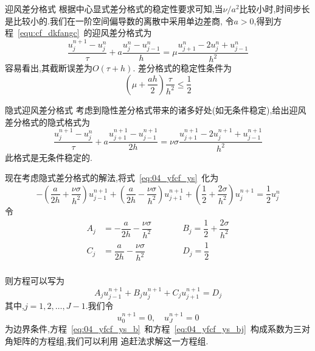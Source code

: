 \documentclass[xcolor=svgnames]{beamer} %
\begin{document}
\begin{frame}{迎风差分格式}
根据中心显式差分格式的稳定性要求可知,当$\nu/a^2$比较小时,时间步长是比较小的.我们在一阶空间偏导数的离散中采用单边差商,
令$a>0$,得到方程~\eqref{equ:cf_dkfangc}~的迎风差分格式为
\begin{equation}\label{eq:cf_dkfangc_yf}
 \dfrac{u_j^{n+1}-u_j^n}{\tau}+a\dfrac{u_j^n-u_{j-1}^n}{h}=\mu\dfrac{u_{j+1}^n-2u_j^n+u_{j-1}^{n}}{h^2}
\end{equation}
容易看出,其截断误差为$O(\tau+h)$.
差分格式的稳定性条件为
\begin{equation}
 \left(\mu+\dfrac{ah}{2}\right)\dfrac{\tau}{h^2}\leq\dfrac{1}{2}
\end{equation}\par
\end{frame}
\begin{frame}{隐式迎风差分格式}
考虑到隐性差分格式带来的诸多好处(如无条件稳定),给出迎风差分格式的隐式格式为
\begin{equation}\label{eq:04_yfcf_ys}
 \dfrac{u_j^{n+1}-u_j^n}{\tau}+a\dfrac{u_{j+1}^{n+1}-u_{j-1}^{n+1}}{2h}=\nu\sigma\dfrac{u_{j+1}^{n+1}
 -2u_j^{n+1}+u_{j-1}^{n+1}}{h^2}
\end{equation}
此格式是无条件稳定的.\par
\end{frame}
\begin{frame}
 现在考虑隐式差分格式的解法,将式~\eqref{eq:04_yfcf_ys}~化为
\begin{equation*}
-\left(\dfrac{a}{2h}+\dfrac{\nu\sigma}{h^2}\right)u_{j-1}^{n+1}+\left(\dfrac{a}{2h}-\dfrac{\nu\sigma}{h^2}\right)u_{j+1}^{n+1}
+\left(\dfrac{1}{2}+\dfrac{2\sigma}{h^2}\right)u_j^{n+1}=\dfrac{1}{2}u_j^n
\end{equation*}
令
\begin{equation*}
\begin{aligned}
A_j &= -\dfrac{a}{2h}-\dfrac{\nu\sigma}{h^2} & \qquad & B_j = \dfrac{1}{2}+\dfrac{2\sigma}{h^2} \\[0.6em]
C_j &= \dfrac{a}{2h}-\dfrac{\nu\sigma}{h^2}  &  \qquad & D_j = \dfrac{1}{2}   \\
\end{aligned}
\end{equation*}
\end{frame}
\begin{frame}
 则方程可以写为
\begin{equation}\label{eq:04_yfcf_ys_b}
 A_j u_{j-1}^{n+1} + B_j u_j^{n+1} + C_j u_{j+1}^{n+1} = D_j
\end{equation}
其中,$j=1,2,\ldots,J-1$.我们令
\begin{equation}\label{eq:04_yfcf_ys_bj}
 u_0^{n+1}=0,\quad u_J^{n+1}=0
\end{equation}
为边界条件,方程~\eqref{eq:04_yfcf_ys_b}~和方程~\eqref{eq:04_yfcf_ys_bj}~构成系数为三对角矩阵的方程组,我们可以利用
追赶法求解这一方程组.
\end{frame}
\end{document}
